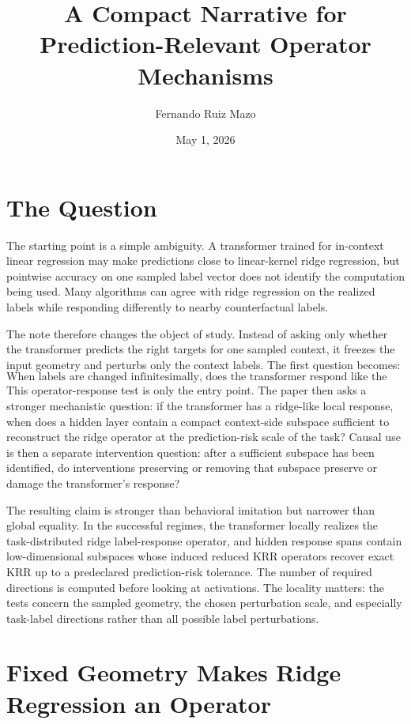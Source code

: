 \documentclass[11pt]{article}
\title{A Compact Narrative for Prediction-Relevant Operator Mechanisms}
\author{Fernando Ruiz Mazo}
\date{May 1, 2026}
\begin{document}
\maketitle

\section{The Question}

The starting point is a simple ambiguity. A transformer trained for in-context linear regression may
make predictions close to linear-kernel ridge regression, but pointwise accuracy on one sampled
label vector does not identify the computation being used. Many algorithms can agree with ridge
regression on the realized labels while responding differently to nearby counterfactual labels.

The note therefore changes the object of study. Instead of asking only whether the transformer
predicts the right targets for one sampled context, it freezes the input geometry and perturbs only
the context labels. The first question becomes:
\[
\text{When labels are changed infinitesimally, does the transformer respond like the ridge operator?}
\]
This operator-response test is only the entry point. The paper then asks a stronger mechanistic
question: if the transformer has a ridge-like local response, when does a hidden layer contain a
compact context-side subspace sufficient to reconstruct the ridge operator at the prediction-risk
scale of the task?  Causal use is then a separate intervention question: after a sufficient subspace
has been identified, do interventions preserving or removing that subspace preserve or damage the
transformer's response?

The resulting claim is stronger than behavioral imitation but narrower than global equality. In the
successful regimes, the transformer locally realizes the task-distributed ridge label-response
operator, and hidden response spans contain low-dimensional subspaces whose induced reduced KRR
operators recover exact KRR up to a predeclared prediction-risk tolerance. The number of required
directions is computed before looking at activations. The locality matters: the tests concern the
sampled geometry, the chosen perturbation scale, and especially task-label directions rather than
all possible label perturbations.

\section{Fixed Geometry Makes Ridge Regression an Operator}
\end{document}
